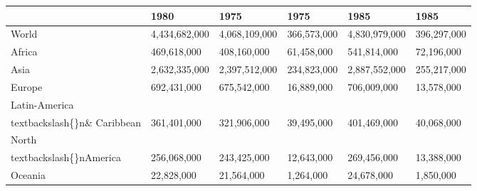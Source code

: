 \documentclass{article}
\begin{document}
\begin{tabular}{llllll}
\toprule
 & 1980 & 1975 & 1975 & 1985 & 1985 \\
\midrule
World & 4,434,682,000 & 4,068,109,000 & 366,573,000 & 4,830,979,000 & 396,297,000 \\
Africa & 469,618,000 & 408,160,000 & 61,458,000 & 541,814,000 & 72,196,000 \\
Asia & 2,632,335,000 & 2,397,512,000 & 234,823,000 & 2,887,552,000 & 255,217,000 \\
Europe & 692,431,000 & 675,542,000 & 16,889,000 & 706,009,000 & 13,578,000 \\
Latin-America\\textbackslash\{\}n\& Caribbean & 361,401,000 & 321,906,000 & 39,495,000 & 401,469,000 & 40,068,000 \\
North\\textbackslash\{\}nAmerica & 256,068,000 & 243,425,000 & 12,643,000 & 269,456,000 & 13,388,000 \\
Oceania & 22,828,000 & 21,564,000 & 1,264,000 & 24,678,000 & 1,850,000 \\
\bottomrule
\end{tabular}
\end{document}
